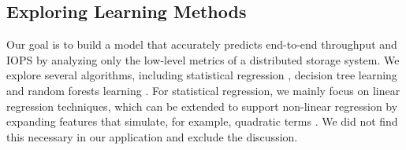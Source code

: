 


\subsection{Exploring Learning Methods}
\label{sec:algorithm_selection}


Our goal is to build a model that accurately predicts end-to-end throughput and IOPS by analyzing only the low-level metrics of a distributed storage system.
We explore several algorithms, including statistical regression \cite{Fron2004, hastie2005}, 
decision tree learning and random forests learning \cite{hastie2005,Wang2004}.
For statistical regression, we mainly focus on linear regression techniques, 
which can be extended to support non-linear regression by expanding features that simulate, 
for example, quadratic terms \cite{Kundu2010}.
We did not find this necessary in our application and exclude the discussion.

